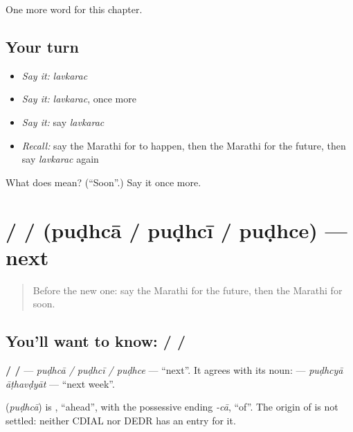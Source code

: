 \begin{grammarlens}[title={What you've built}]
One more word for this chapter.
\end{grammarlens}

\subsection*{Your turn}
\begin{itemize}
\raggedright
  \item \emph{Say it:} \emph{lavkarac}
  \item \emph{Say it:} \emph{lavkarac}, once more
  \item \emph{Say it:} say \emph{lavkarac}
  \item \emph{Recall:} say the Marathi for to happen, then the Marathi for the future, then say \emph{lavkarac} again
\end{itemize}

\begin{tcolorbox}[breakable,colback=teal!4,colframe=teal!35!black,title={Before you move on}]
What does  mean? (\textquotedblleft{}Soon\textquotedblright{}.) Say it once more.
\end{tcolorbox}
\section[\texorpdfstring{\mr{पुढचा} / \mr{पुढची} / \mr{पुढचे} (puḍhcā / puḍhcī …)}{पुढचा / पुढची / पुढचे (puḍhcā / puḍhcī …)}]{ /  /  (puḍhcā / puḍhcī / puḍhce) — next}

\label{lesson:MR-C160-pudhca}



\begin{quote}
Before the new one: say the Marathi for the future, then the Marathi for soon.
\end{quote}

\subsection*{You'll want to know:  /  / }
\textbf{ /  / } — \emph{puḍhcā / puḍhcī / puḍhce} — \textquotedblleft{}next\textquotedblright{}. It agrees with its noun: \textbf{ } — \emph{puḍhcyā āṭhavḍyāt} — \textquotedblleft{}next week\textquotedblright{}.

\begin{cousinweb}
\textbf{} (\emph{puḍhcā}) is \textbf{}, \textquotedblleft{}ahead\textquotedblright{}, with the possessive ending \emph{-cā}, \textquotedblleft{}of\textquotedblright{}. The origin of \textbf{} is not settled: neither CDIAL nor DEDR has an entry for it.
\end{cousinweb}


